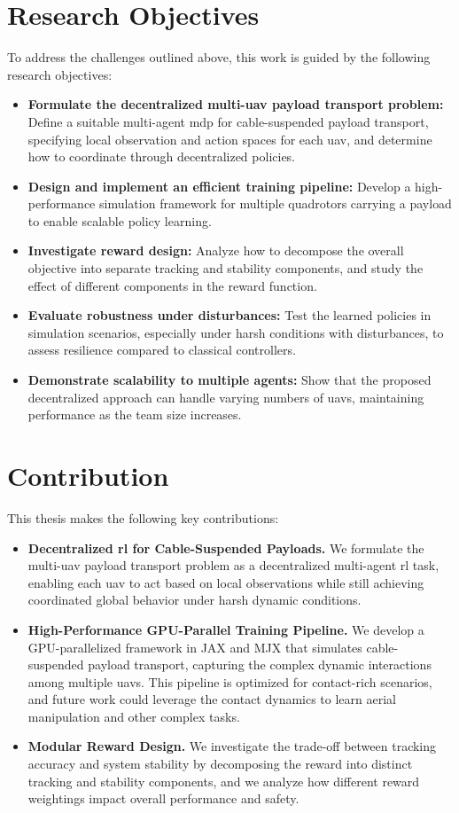 \section{Research Objectives}
To address the challenges outlined above, this work is guided by the following research objectives:
\begin{itemize}
    \item \textbf{Formulate the decentralized multi-\gls{uav} payload transport problem:} Define a suitable multi-agent \gls{mdp} for cable-suspended payload transport, specifying local observation and action spaces for each \gls{uav}, and determine how to coordinate through decentralized policies.
    \item \textbf{Design and implement an efficient training pipeline:} Develop a high-performance simulation framework for multiple quadrotors carrying a payload to enable scalable policy learning.
    \item \textbf{Investigate reward design:} Analyze how to decompose the overall objective into separate tracking and stability components, and study the effect of different components in the reward function.
    \item \textbf{Evaluate robustness under disturbances:} Test the learned policies in simulation scenarios, especially under harsh conditions with disturbances, to assess resilience compared to classical controllers.
    \item \textbf{Demonstrate scalability to multiple agents:} Show that the proposed decentralized approach can handle varying numbers of \glspl{uav}, maintaining performance as the team size increases.
\end{itemize}
\section{Contribution}
This thesis makes the following key contributions:
\begin{itemize}
    \item \textbf{Decentralized \gls{rl} for Cable-Suspended Payloads.} We formulate the multi-\gls{uav} payload transport problem as a decentralized multi-agent \gls{rl} task, enabling each \gls{uav} to act based on local observations while still achieving coordinated global behavior under harsh dynamic conditions.
    \item \textbf{High-Performance GPU-Parallel Training Pipeline.} We develop a GPU-parallelized framework in JAX and MJX that simulates cable-suspended payload transport, capturing the complex dynamic interactions among multiple \glspl{uav}. This pipeline is optimized for contact-rich scenarios, and future work could leverage the contact dynamics to learn aerial manipulation and other complex tasks.
    \item \textbf{Modular Reward Design.} We investigate the trade-off between tracking accuracy and system stability by decomposing the reward into distinct tracking and stability components, and we analyze how different reward weightings impact overall performance and safety.
\end{itemize}

